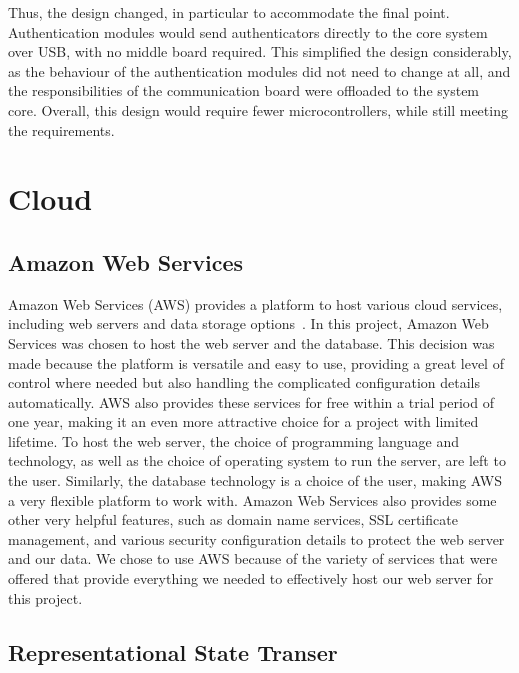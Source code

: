 \documentclass[12pt]{report}
\let\Oldsection\section
\renewcommand{\section}{\FloatBarrier\Oldsection}
\let\Oldsubsection\subsection
\renewcommand{\subsection}{\FloatBarrier\Oldsubsection}
\begin{document}
Thus, the design changed, in particular to accommodate the final point. Authentication modules would send 
authenticators directly to the core system over USB, with no middle board required. This simplified the design 
considerably, as the behaviour of the authentication modules did not need to change at all, and the responsibilities 
of the communication board were offloaded to the system core. Overall, this design would require fewer 
microcontrollers, while still meeting the requirements.


\section{Cloud} \label{cloud}

\subsection{Amazon Web Services} \label{amazon-web-services}

Amazon Web Services (AWS) provides a platform to host various cloud services,
including web servers and data storage options~\autocite{AMAZONWEBSERVICES}. In this
project, Amazon Web Services was chosen to host the web server and the database. This
decision was made because the platform is versatile and easy to use, providing a great level of
control where needed but also handling the complicated configuration details automatically.
AWS also provides these services for free within a trial period of one year, making it an even
more attractive choice for a project with limited lifetime. To host the web server, the choice of
programming language and technology, as well as the choice of operating system to run the
server, are left to the user. Similarly, the database technology is a choice of the user, making
AWS a very flexible platform to work with. Amazon Web Services also provides some other
very helpful features, such as domain name services, SSL certificate management, and various
security configuration details to protect the web server and our data. We chose to use AWS
because of the variety of services that were offered that provide everything we needed to
effectively host our web server for this project.

\subsection{Representational State Transer} \label{representational-state-transer}
\end{document}
